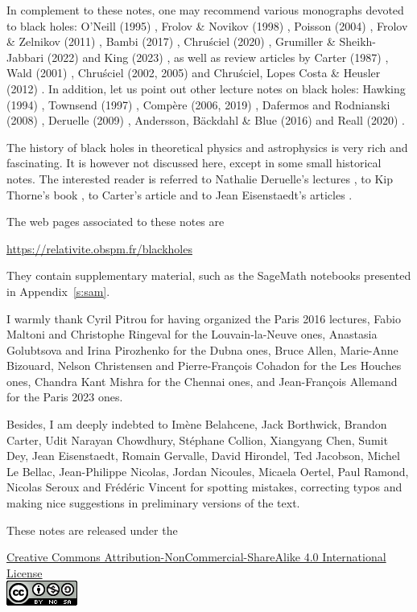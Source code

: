 In complement to these notes, one may recommend various monographs devoted to black holes:
O'Neill (1995) \cite{ONeil95}, Frolov \& Novikov (1998) \cite{FroloN98}, Poisson (2004) \cite{Poiss04},
Frolov \& Zelnikov (2011) \cite{FroloZ11}, Bambi (2017) \cite{Bambi17}, Chru\'sciel (2020) \cite{Chrus20},
Grumiller \& Sheikh-Jabbari (2022) \cite{GrumiS22} and King (2023) \cite{King23},
as well as review articles by
Carter (1987) \cite{Carte87}, Wald (2001) \cite{Wald01},
Chru\'sciel (2002, 2005) \cite{Chrus02, Chrus05} and Chru\'sciel, Lopes Costa \& Heusler (2012) \cite{ChrusLH12}.
In addition, let us point out other lecture notes on black holes:
Hawking (1994) \cite{Hawki94,HawkiP15}, Townsend (1997) \cite{Towns97},
Compère (2006, 2019) \cite{Compe06,Compe19}, Dafermos and Rodnianski (2008) \cite{DaferR13},
Deruelle (2009) \cite{Derue09}, Andersson, Bäckdahl \& Blue (2016) \cite{AnderBB18}
and Reall (2020) \cite{Reall20}.

The history of black holes in theoretical physics and astrophysics is
very rich and fascinating. It is however not discussed here, except in some
small historical notes. The interested
reader is referred to Nathalie Deruelle's lectures \cite{Derue09}, to Kip Thorne's
book \cite{Thorn94}, to Carter's article \cite{Carte06}
and to Jean Eisenstaedt's articles \cite{Eisen82,Eisen93}.


The web pages associated to these notes are
\begin{center}
\url{https://relativite.obspm.fr/blackholes}
\end{center}
They contain supplementary material, such as the SageMath notebooks presented in
Appendix~\ref{s:sam}.

\vspace{2ex}

I warmly thank Cyril Pitrou for having organized the Paris 2016 lectures,
Fabio Maltoni and Christophe Ringeval for the Louvain-la-Neuve ones,
Anastasia Golubtsova and Irina Pirozhenko for the Dubna ones,
Bruce Allen, Marie-Anne Bizouard, Nelson Christensen and Pierre-François Cohadon for the Les Houches ones,
Chandra Kant Mishra for the Chennai ones,
and Jean-François Allemand for the Paris 2023 ones.

Besides, I am deeply indebted to
Imène Belahcene, Jack Borthwick, Brandon Carter,
Udit Narayan Chowdhury, Stéphane Collion, Xiangyang Chen,
Sumit Dey, Jean Eisenstaedt, Romain Gervalle, David Hirondel,
Ted Jacobson, Michel Le Bellac, Jean-Philippe Nicolas, Jordan Nicoules, Micaela Oertel,
Paul Ramond, Nicolas Seroux and Frédéric Vincent for spotting mistakes, correcting typos and making
nice suggestions in preliminary versions of the text.


\vspace{3ex}
These notes are released under the
\begin{center}
\href{https://creativecommons.org/licenses/by-nc-sa/4.0/}{{Creative Commons Attribution-NonCommercial-ShareAlike 4.0 International License}}\\[1ex]
\includegraphics[height=0.03\textheight]{cc_license.png}
\end{center}


